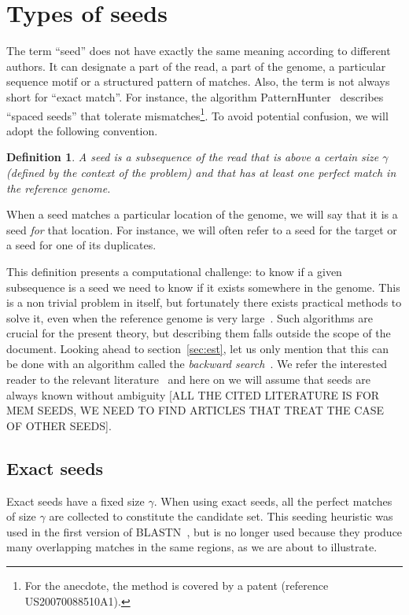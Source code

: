 \documentclass{article}
\newtheorem{definition}{Definition}
\begin{document}
\section{Types of seeds}

The term ``seed'' does not have exactly the same meaning according to
different authors. It can designate a part of the read, a part of the
genome, a particular sequence motif or a structured pattern of matches.
Also, the term is not always short for ``exact match''. For instance, the
algorithm PatternHunter~\cite{pmid11934743} describes ``spaced seeds''
that tolerate mismatches\footnote{For the anecdote, the method is covered
by a patent (reference US20070088510A1).}. To avoid potential confusion,
we will adopt the following convention.

\begin{definition}
A seed is a subsequence of the read that is above a certain size $\gamma$
(defined by the context of the problem) and that has at least one perfect
match in the reference genome.
\end{definition}

When a seed matches a particular location of the genome, we will say that
it is a seed \emph{for} that location. For instance, we will often refer
to a seed for the target or a seed for one of its duplicates.

This definition presents a computational challenge: to know if a given
subsequence is a seed we need to know if it exists somewhere in the
genome. This is a non trivial problem in itself, but fortunately there
exists practical methods to solve it, even when the reference genome is
very large~\cite{ferragina2000opportunistic, ferragina2005indexing}. Such
algorithms are crucial for the present theory, but describing them
falls outside the scope of the document. Looking ahead to
section~\ref{sec:est}, let us only mention that this can be done with an
algorithm called the \emph{backward
search}~\cite{ferragina2000opportunistic}. We refer the interested reader
to the relevant
literature~\cite{pmid24336412,pmid25399029,pmid23349213,pmid19389736} and
here on we will assume that seeds are always known without ambiguity [ALL
THE CITED LITERATURE IS FOR MEM SEEDS, WE NEED TO FIND ARTICLES THAT TREAT
THE CASE OF OTHER SEEDS].


\subsection{Exact seeds}

Exact seeds have a fixed size $\gamma$. When using exact seeds, all the
perfect matches of size $\gamma$ are collected to constitute the candidate
set. This seeding heuristic was used in the first version of
BLASTN~\cite{pmid2231712}, but is no longer used because they produce many
overlapping matches in the same regions, as we are about to illustrate.
\end{document}
